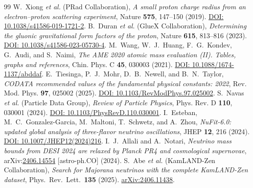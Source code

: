 \documentclass[11pt,a4paper]{article}
\theoremstyle{definition}
\theoremstyle{remark}
\begin{document}
\begin{thebibliography}{99}
	 W.~Xiong \textit{et al.} (PRad Collaboration), \textit{A small proton charge radius from an electron–proton scattering experiment}, Nature \textbf{575}, 147--150 (2019). \href{https://doi.org/10.1038/s41586-019-1721-2}{DOI: 10.1038/s41586-019-1721-2}.
	 B.~Duran \textit{et al.} (GlueX Collaboration), \textit{Determining the gluonic gravitational form factors of the proton}, Nature \textbf{615}, 813--816 (2023). \href{https://doi.org/10.1038/s41586-023-05730-4}{DOI: 10.1038/s41586-023-05730-4}.
	 M.~Wang, W.~J.~Huang, F.~G.~Kondev, G.~Audi, and S.~Naimi, \textit{The AME 2020 atomic mass evaluation (II). Tables, graphs and references}, Chin. Phys. C \textbf{45}, 030003 (2021). \href{https://doi.org/10.1088/1674-1137/abddaf}{DOI: 10.1088/1674-1137/abddaf}.
	 E.~Tiesinga, P.~J.~Mohr, D.~B.~Newell, and B.~N.~Taylor, \textit{CODATA recommended values of the fundamental physical constants: 2022}, Rev. Mod. Phys. \textbf{97}, 025002 (2025). \href{https://doi.org/10.1103/RevModPhys.97.025002}{DOI: 10.1103/RevModPhys.97.025002}.
	 S.~Navas \textit{et al.} (Particle Data Group), \textit{Review of Particle Physics}, Phys. Rev. D \textbf{110}, 030001 (2024). \href{https://doi.org/10.1103/PhysRevD.110.030001}{DOI: 10.1103/PhysRevD.110.030001}.
	 I.~Esteban, M.~C.~Gonzalez-Garcia, M.~Maltoni, T.~Schwetz, and A.~Zhou, \textit{NuFit-6.0: updated global analysis of three-flavor neutrino oscillations}, JHEP \textbf{12}, 216 (2024). \href{https://doi.org/10.1007/JHEP12(2024)216}{DOI: 10.1007/JHEP12(2024)216}.
	 I.~J.~Allali and A.~Notari, \textit{Neutrino mass bounds from DESI 2024 are relaxed by Planck PR4 and cosmological supernovae}, arXiv:\href{https://arxiv.org/abs/2406.14554}{2406.14554} [astro-ph.CO] (2024).
	 S.~Abe \textit{et al.} (KamLAND-Zen Collaboration), \textit{Search for Majorana neutrinos with the complete KamLAND-Zen dataset}, Phys.\ Rev.\ Lett.\ \textbf{135} (2025). \href{https://arxiv.org/abs/2406.11438}{arXiv:2406.11438}.
	
\end{thebibliography}
\end{document}
